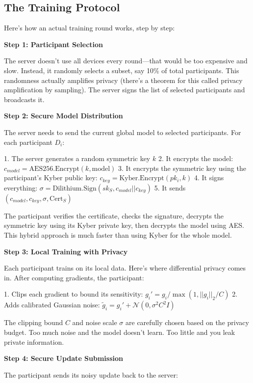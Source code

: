 \documentclass[journal,onecolumn]{IEEEtran}
\begin{document}
\subsection{The Training Protocol}

Here's how an actual training round works, step by step:

\textbf{Step 1: Participant Selection}

The server doesn't use all devices every round—that would be too expensive and slow. Instead, it randomly selects a subset, say 10\% of total participants. This randomness actually amplifies privacy (there's a theorem for this called privacy amplification by sampling). The server signs the list of selected participants and broadcasts it.

\textbf{Step 2: Secure Model Distribution}

The server needs to send the current global model to selected participants. For each participant $D_i$:

1. The server generates a random symmetric key $k$
2. It encrypts the model: $c_{model} = \text{AES256.Encrypt}(k, \text{model})$  
3. It encrypts the symmetric key using the participant's Kyber public key: $c_{key} = \text{Kyber.Encrypt}(pk_i, k)$
4. It signs everything: $\sigma = \text{Dilithium.Sign}(sk_S, c_{model} || c_{key})$
5. It sends $(c_{model}, c_{key}, \sigma, \text{Cert}_S)$

The participant verifies the certificate, checks the signature, decrypts the symmetric key using its Kyber private key, then decrypts the model using AES. This hybrid approach is much faster than using Kyber for the whole model.

\textbf{Step 3: Local Training with Privacy}

Each participant trains on its local data. Here's where differential privacy comes in. After computing gradients, the participant:

1. Clips each gradient to bound its sensitivity: $g_i' = g_i / \max(1, ||g_i||_2 / C)$
2. Adds calibrated Gaussian noise: $\tilde{g}_i = g_i' + \mathcal{N}(0, \sigma^2 C^2 I)$

The clipping bound $C$ and noise scale $\sigma$ are carefully chosen based on the privacy budget. Too much noise and the model doesn't learn. Too little and you leak private information.

\textbf{Step 4: Secure Update Submission}

The participant sends its noisy update back to the server:
\end{document}
